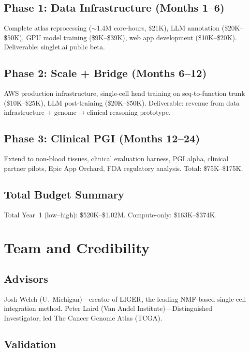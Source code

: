 \documentclass[10pt,twocolumn,letterpaper]{article}
\begin{document}
\subsection{Phase 1: Data Infrastructure (Months 1--6)}

Complete atlas reprocessing ($\sim$1.4M core-hours, \$21K), LLM annotation
(\$20K--\$50K), GPU model training (\$9K--\$39K), web app development
(\$10K--\$20K). Deliverable: singlet.ai public beta.

\subsection{Phase 2: Scale + Bridge (Months 6--12)}

AWS production infrastructure, single-cell head training on seq-to-function trunk
(\$10K--\$25K), LLM post-training (\$20K--\$50K). Deliverable: revenue from data
infrastructure + genome$\to$clinical reasoning prototype.

\subsection{Phase 3: Clinical PGI (Months 12--24)}

Extend to non-blood tissues, clinical evaluation harness, PGI alpha, clinical
partner pilots, Epic App Orchard, FDA regulatory analysis. Total: \$75K--\$175K.

\subsection{Total Budget Summary}

Total Year~1 (low--high): \$520K--\$1.02M. Compute-only: \$163K--\$374K.

\section{Team and Credibility}
\label{sec:team}

\subsection{Advisors}

Josh Welch (U.~Michigan)---creator of LIGER, the leading NMF-based single-cell
integration method. Peter Laird (Van Andel Institute)---Distinguished
Investigator, led The Cancer Genome Atlas (TCGA).

\subsection{Validation}
\end{document}
